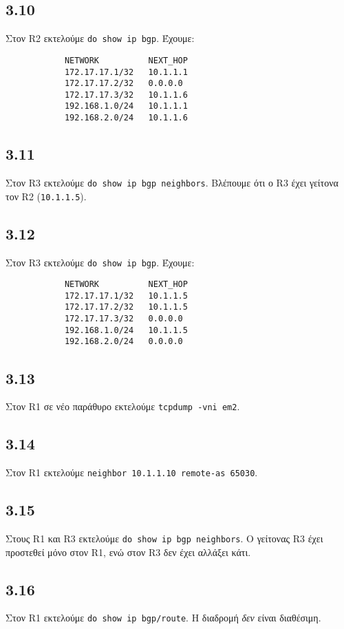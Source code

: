 \documentclass[a4paper, 12pt]{article}
\begin{document}
	\subsection*{3.10}
		Στον R2 εκτελούμε \verb|do show ip bgp|. Έχουμε:
		
		\begin{verbatim}
			NETWORK          NEXT_HOP
			172.17.17.1/32   10.1.1.1
			172.17.17.2/32   0.0.0.0
			172.17.17.3/32   10.1.1.6
			192.168.1.0/24   10.1.1.1
			192.168.2.0/24   10.1.1.6
		\end{verbatim}

	\subsection*{3.11}
		Στον R3 εκτελούμε \verb|do show ip bgp neighbors|. Βλέπουμε ότι ο R3 έχει γείτονα τον R2 (\verb|10.1.1.5|).

	\subsection*{3.12}
		Στον R3 εκτελούμε \verb|do show ip bgp|. Έχουμε:
		
		\begin{verbatim}
			NETWORK          NEXT_HOP
			172.17.17.1/32   10.1.1.5
			172.17.17.2/32   10.1.1.5
			172.17.17.3/32   0.0.0.0
			192.168.1.0/24   10.1.1.5
			192.168.2.0/24   0.0.0.0
		\end{verbatim}

	\subsection*{3.13}
		Στον R1 σε νέο παράθυρο εκτελούμε \verb|tcpdump -vni em2|.

	\subsection*{3.14}
		Στον R1 εκτελούμε \verb|neighbor 10.1.1.10 remote-as 65030|.

	\subsection*{3.15}
		Στους R1 και R3 εκτελούμε \verb|do show ip bgp neighbors|. Ο γείτονας R3 έχει προστεθεί μόνο στον R1, ενώ στον R3 δεν έχει αλλάξει κάτι.

	\subsection*{3.16}
		Στον R1 εκτελούμε \verb|do show ip bgp/route|. Η διαδρομή \emph{δεν} είναι διαθέσιμη.
\end{document}
